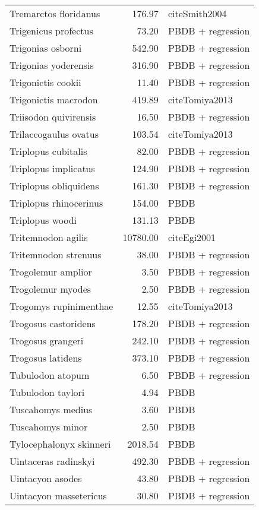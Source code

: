 \begin{table}[ht]
\begin{tabular}{lrl}
  Tremarctos floridanus & 176.97 & cite{Smith2004} \\ 
  Trigenicus profectus & 73.20 & PBDB + regression \\ 
  Trigonias osborni & 542.90 & PBDB + regression \\ 
  Trigonias yoderensis & 316.90 & PBDB + regression \\ 
  Trigonictis cookii & 11.40 & PBDB + regression \\ 
  Trigonictis macrodon & 419.89 & cite{Tomiya2013} \\ 
  Triisodon quivirensis & 16.50 & PBDB + regression \\ 
  Trilaccogaulus ovatus & 103.54 & cite{Tomiya2013} \\ 
  Triplopus cubitalis & 82.00 & PBDB + regression \\ 
  Triplopus implicatus & 124.90 & PBDB + regression \\ 
  Triplopus obliquidens & 161.30 & PBDB + regression \\ 
  Triplopus rhinocerinus & 154.00 & PBDB \\ 
  Triplopus woodi & 131.13 & PBDB \\ 
  Tritemnodon agilis & 10780.00 & cite{Egi2001} \\ 
  Tritemnodon strenuus & 38.00 & PBDB + regression \\ 
  Trogolemur amplior & 3.50 & PBDB + regression \\ 
  Trogolemur myodes & 2.50 & PBDB + regression \\ 
  Trogomys rupinimenthae & 12.55 & cite{Tomiya2013} \\ 
  Trogosus castoridens & 178.20 & PBDB + regression \\ 
  Trogosus grangeri & 242.10 & PBDB + regression \\ 
  Trogosus latidens & 373.10 & PBDB + regression \\ 
  Tubulodon atopum & 6.50 & PBDB + regression \\ 
  Tubulodon taylori & 4.94 & PBDB \\ 
  Tuscahomys medius & 3.60 & PBDB \\ 
  Tuscahomys minor & 2.50 & PBDB \\ 
  Tylocephalonyx skinneri & 2018.54 & PBDB \\ 
  Uintaceras radinskyi & 492.30 & PBDB + regression \\ 
  Uintacyon asodes & 43.80 & PBDB + regression \\ 
  Uintacyon massetericus & 30.80 & PBDB + regression \\ 

\end{tabular}
\end{table}
